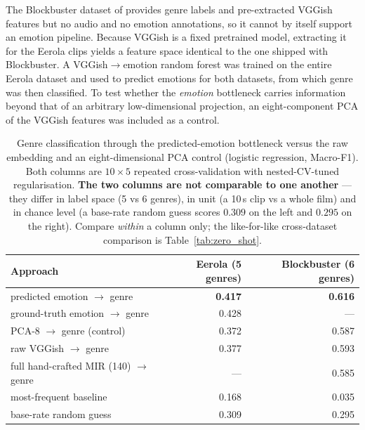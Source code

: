 The Blockbuster dataset of \citet{ma2021computational} provides genre labels and
pre-extracted VGGish features but no audio and no emotion annotations, so it cannot by itself
support an emotion pipeline. Because VGGish is a fixed pretrained model, extracting it for the
Eerola clips yields a feature space identical to the one shipped with Blockbuster. A
VGGish$\to$emotion random forest was trained on the entire Eerola dataset and used to predict
emotions for both datasets, from which genre was then classified. To test whether the
\emph{emotion} bottleneck carries information beyond that of an arbitrary low-dimensional
projection, an eight-component PCA of the VGGish features was included as a control.

\begin{table}[t]
  \centering
  \caption{Genre classification through the predicted-emotion bottleneck versus the raw
    embedding and an eight-dimensional PCA control (logistic regression, Macro-F1).
    Both columns are $10\times5$ repeated cross-validation with nested-CV-tuned
    regularisation. \textbf{The two columns are not comparable to one another} --- they
    differ in label space (5 vs 6 genres), in unit (a 10\,s clip vs a whole film) and
    in chance level (a base-rate random guess scores $0.309$ on the left and $0.295$ on
    the right). Compare \emph{within} a column only; the like-for-like cross-dataset
    comparison is Table~\ref{tab:zero_shot}.}
  \label{tab:emotion_transfer}
  \begin{tabular}{lrr}
    \hline
    Approach & Eerola (5 genres) & Blockbuster (6 genres) \\
    \hline
    predicted emotion $\rightarrow$ genre & \textbf{0.417} & \textbf{0.616} \\
    ground-truth emotion $\rightarrow$ genre & 0.428 & --- \\
    PCA-8 $\rightarrow$ genre (control) & 0.372 & 0.587 \\
    raw VGGish $\rightarrow$ genre & 0.377 & 0.593 \\
    full hand-crafted MIR (140) $\rightarrow$ genre & --- & 0.585 \\
    most-frequent baseline & 0.168 & 0.035 \\
    base-rate random guess & 0.309 & 0.295 \\
    \hline
  \end{tabular}
\end{table}


